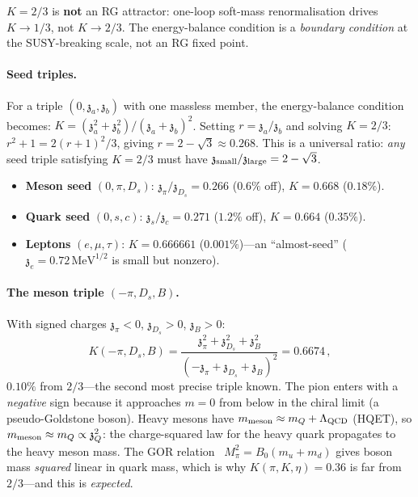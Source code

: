 \documentclass[12pt,a4paper]{article}
\newcommand{\MeV}{\,\mathrm{MeV}}
\newcommand{\zch}{\mathfrak{z}}
\begin{document}
$K = 2/3$ is \textbf{not} an RG attractor: one-loop soft-mass
renormalisation drives $K \to 1/3$, not $K \to 2/3$.
The energy-balance condition is a \emph{boundary condition} at
the SUSY-breaking scale, not an RG fixed point.

\paragraph{Seed triples.}
For a triple $(0, \zch_a, \zch_b)$ with one massless member,
the energy-balance condition becomes:
$K = (\zch_a^2 + \zch_b^2)/(\zch_a + \zch_b)^2$.
Setting $r = \zch_a/\zch_b$ and solving $K = 2/3$:
$r^2 + 1 = 2(r + 1)^2/3$, giving $r = 2 - \sqrt{3}
\approx 0.268$.
This is a universal ratio: \emph{any} seed triple satisfying
$K = 2/3$ must have $\zch_{\rm small}/\zch_{\rm large}
= 2 - \sqrt{3}$.
\begin{itemize}
  \item \textbf{Meson seed} $(0, \pi, D_s)$:
    $\zch_\pi/\zch_{D_s} = 0.266$ ($0.6\%$ off),
    $K = 0.668$ ($0.18\%$).
  \item \textbf{Quark seed} $(0, s, c)$:
    $\zch_s/\zch_c = 0.271$ ($1.2\%$ off),
    $K = 0.664$ ($0.35\%$).
  \item \textbf{Leptons} $(e, \mu, \tau)$:
    $K = 0.666661$ ($0.001\%$)---an ``almost-seed''
    ($\zch_e = 0.72\MeV^{1/2}$ is small but nonzero).
\end{itemize}

\paragraph{The meson triple $(-\pi, D_s, B)$.}
With signed charges $\zch_\pi < 0$, $\zch_{D_s} > 0$,
$\zch_B > 0$:
\begin{equation}
  K(-\pi, D_s, B) = \frac{\zch_\pi^2 + \zch_{D_s}^2 + \zch_B^2}
  {(-\zch_\pi + \zch_{D_s} + \zch_B)^2}
  = 0.6674\,,
\end{equation}
$0.10\%$ from $2/3$---the second most precise triple known.
The pion enters with a \emph{negative} sign because it approaches
$m = 0$ from below in the chiral limit (a pseudo-Goldstone boson).
Heavy mesons have $m_{\rm meson} \approx m_Q + \Lambda_{\rm QCD}$
(HQET), so $m_{\rm meson} \approx m_Q \propto \zch_Q^2$: the
charge-squared law for the heavy quark propagates to the heavy
meson mass.
The GOR relation~\cite{GellMannOakesRenner:1968}
$M_\pi^2 = B_0(m_u + m_d)$ gives boson mass \emph{squared}
linear in quark mass, which is why $K(\pi, K, \eta) = 0.36$ is
far from $2/3$---and this is \emph{expected}.
\end{document}
